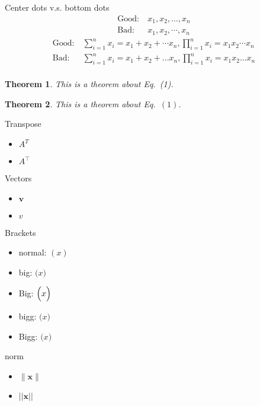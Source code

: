 \documentclass[dvipdfmx]{article}
\newtheorem{theorem1}{Theorem}
\begin{document}
Center dots v.s. bottom dots
\begin{equation}
\begin{aligned}
  \text{Good}:~& x_1, x_2, \dots, x_n \\
  \text{Bad}:~& x_1, x_2, \cdots, x_n
\end{aligned}
\end{equation}
\begin{equation}
  \begin{aligned}
    \text{Good}:~& \sum_{i=1}^n x_i = x_1 + x_2 + \cdots x_n,
    \prod_{i=1}^n x_i = x_1 x_2 \cdots x_n \\
    \text{Bad}:~& \sum_{i=1}^n x_i = x_1 + x_2 + \dots x_n,
    \prod_{i=1}^n x_i = x_1 x_2 \dots x_n \\
  \end{aligned}
  \end{equation}

  \begin{theorem1}\leavevmode \par
    This is a theorem about Eq.~(1).
  \end{theorem1}
  \begin{theorem1}\leavevmode \par
    This is a theorem about Eq.~$\mathrm{(1)}$.
  \end{theorem1}

Transpose
\begin{itemize}
  \item $A^T$
  \item $A^\top$
\end{itemize}

Vectors
\begin{itemize}
  \item $\boldsymbol{v}$
  \item $v$
\end{itemize}

Brackets
\begin{itemize}
  \item normal: $(x)$
  \item big: $\bigl(x\bigr)$
  \item Big: $\Bigl(x\Bigr)$
  \item bigg: $\biggl(x\biggr)$
  \item Bigg: $\Biggl(x\Biggr)$
\end{itemize}

norm
\begin{itemize}
  \item $\|\boldsymbol{x}\|$
  \item $||\boldsymbol{x}||$
\end{itemize}
\end{document}

